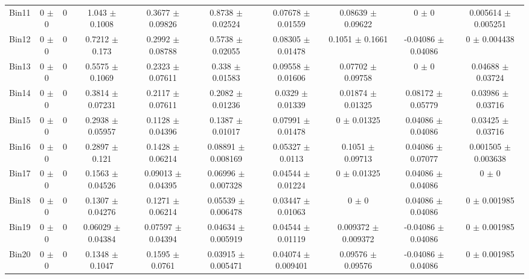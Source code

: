 \begin{tabular}{@{\extracolsep{4pt}}lccccccccc@{}}
     Bin11 & 0 $\pm$ 0 & 0 & 1.043 $\pm$ 0.1008 & 0.3677 $\pm$ 0.09826 & 0.8738 $\pm$ 0.02524 & 0.07678 $\pm$ 0.01559 & 0.08639 $\pm$ 0.09622 & 0 $\pm$ 0 & 0.005614 $\pm$ 0.005251 \\ 
     Bin12 & 0 $\pm$ 0 & 0 & 0.7212 $\pm$ 0.173 & 0.2992 $\pm$ 0.08788 & 0.5738 $\pm$ 0.02055 & 0.08305 $\pm$ 0.01478 & 0.1051 $\pm$ 0.1661 & -0.04086 $\pm$ 0.04086 & 0 $\pm$ 0.004438 \\ 
     Bin13 & 0 $\pm$ 0 & 0 & 0.5575 $\pm$ 0.1069 & 0.2323 $\pm$ 0.07611 & 0.338 $\pm$ 0.01583 & 0.09558 $\pm$ 0.01606 & 0.07702 $\pm$ 0.09758 & 0 $\pm$ 0 & 0.04688 $\pm$ 0.03724 \\ 
     Bin14 & 0 $\pm$ 0 & 0 & 0.3814 $\pm$ 0.07231 & 0.2117 $\pm$ 0.07611 & 0.2082 $\pm$ 0.01236 & 0.0329 $\pm$ 0.01339 & 0.01874 $\pm$ 0.01325 & 0.08172 $\pm$ 0.05779 & 0.03986 $\pm$ 0.03716 \\ 
     Bin15 & 0 $\pm$ 0 & 0 & 0.2938 $\pm$ 0.05957 & 0.1128 $\pm$ 0.04396 & 0.1387 $\pm$ 0.01017 & 0.07991 $\pm$ 0.01478 & 0 $\pm$ 0.01325 & 0.04086 $\pm$ 0.04086 & 0.03425 $\pm$ 0.03716 \\ 
     Bin16 & 0 $\pm$ 0 & 0 & 0.2897 $\pm$ 0.121 & 0.1428 $\pm$ 0.06214 & 0.08891 $\pm$ 0.008169 & 0.05327 $\pm$ 0.0113 & 0.1051 $\pm$ 0.09713 & 0.04086 $\pm$ 0.07077 & 0.001505 $\pm$ 0.003638 \\ 
     Bin17 & 0 $\pm$ 0 & 0 & 0.1563 $\pm$ 0.04526 & 0.09013 $\pm$ 0.04395 & 0.06996 $\pm$ 0.007328 & 0.04544 $\pm$ 0.01224 & 0 $\pm$ 0.01325 & 0.04086 $\pm$ 0.04086 & 0 $\pm$ 0 \\ 
     Bin18 & 0 $\pm$ 0 & 0 & 0.1307 $\pm$ 0.04276 & 0.1271 $\pm$ 0.06214 & 0.05539 $\pm$ 0.006478 & 0.03447 $\pm$ 0.01063 & 0 $\pm$ 0 & 0.04086 $\pm$ 0.04086 & 0 $\pm$ 0.001985 \\ 
     Bin19 & 0 $\pm$ 0 & 0 & 0.06029 $\pm$ 0.04384 & 0.07597 $\pm$ 0.04394 & 0.04634 $\pm$ 0.005919 & 0.04544 $\pm$ 0.01119 & 0.009372 $\pm$ 0.009372 & -0.04086 $\pm$ 0.04086 & 0 $\pm$ 0.001985 \\ 
     Bin20 & 0 $\pm$ 0 & 0 & 0.1348 $\pm$ 0.1047 & 0.1595 $\pm$ 0.0761 & 0.03915 $\pm$ 0.005471 & 0.04074 $\pm$ 0.009401 & 0.09576 $\pm$ 0.09576 & -0.04086 $\pm$ 0.04086 & 0 $\pm$ 0.001985 \\ 
\hline\hline
  \end{tabular}

